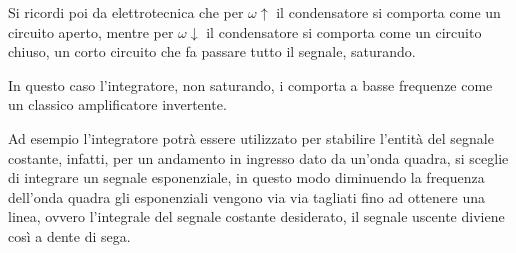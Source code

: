 \documentclass[a4paper, 15pt]{article}
\begin{document}
\begin{adjustwidth}{2in}{}
   		Si ricordi poi da elettrotecnica che per $\omega\uparrow$ il condensatore si comporta come un circuito aperto, mentre per $\omega\downarrow$ il condensatore si comporta come un circuito chiuso, un corto circuito che fa passare tutto il segnale, saturando. 
   		
   		In questo caso l'integratore, non saturando, i comporta a basse frequenze come un classico amplificatore invertente. \newline 
   		
   		Ad esempio l'integratore potrà essere utilizzato per stabilire l'entità del segnale costante, infatti, per un andamento in ingresso dato da un'onda quadra, si sceglie di integrare un segnale esponenziale, in questo modo diminuendo la frequenza dell'onda quadra gli esponenziali vengono via via tagliati fino ad ottenere una linea, ovvero l'integrale del segnale costante desiderato, il segnale uscente diviene così a dente di sega. 
\end{adjustwidth}
\newpage
\end{document}
